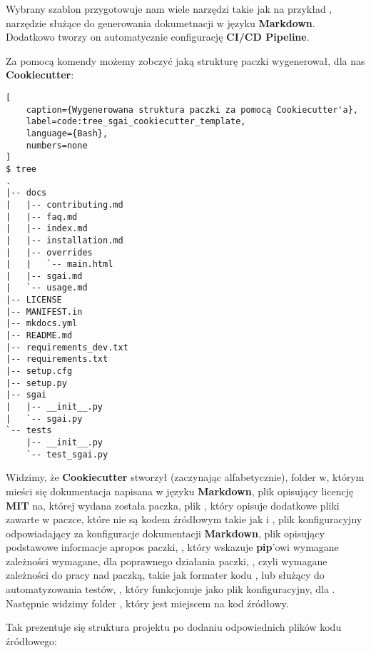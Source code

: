 Wybrany szablon przygotowuje nam wiele narzędzi takie jak na przykład , narzędzie służące do generowania dokumetnacji w języku \textbf{Markdown}.
Dodatkowo tworzy on automatycznie configurację \textbf{CI/CD Pipeline}.

\clearpage

Za pomocą komendy  możemy zobczyć jaką strukturę paczki wygenerował, dla nas \textbf{Cookiecutter}:

\begin{onepage}
    \begin{lstlisting}[
    caption={Wygenerowana struktura paczki za pomocą Cookiecutter'a},
    label=code:tree_sgai_cookiecutter_template,
    language={Bash},
    numbers=none
]
$ tree
.
|-- docs
|   |-- contributing.md
|   |-- faq.md
|   |-- index.md
|   |-- installation.md
|   |-- overrides
|   |   `-- main.html
|   |-- sgai.md
|   `-- usage.md
|-- LICENSE
|-- MANIFEST.in
|-- mkdocs.yml
|-- README.md
|-- requirements_dev.txt
|-- requirements.txt
|-- setup.cfg
|-- setup.py
|-- sgai
|   |-- __init__.py
|   `-- sgai.py
`-- tests
    |-- __init__.py
    `-- test_sgai.py
    \end{lstlisting}
\end{onepage}


Widzimy, że \textbf{Cookiecutter} stworzył (zaczynając alfabetycznie), folder  w, którym mieści się dokumentacja napisana w języku \textbf{Markdown}, plik  opisujący licencję \textbf{MIT} na, której wydana została paczka, plik , który opisuje dodatkowe pliki zawarte w paczce, które nie są kodem źródłowym takie jak  i , plik konfiguracyjny  odpowiadający za konfiguracje dokumentacji \textbf{Markdown}, plik  opisujący podstawowe informacje apropos paczki, , który wskazuje \textbf{pip}'owi wymagane zależności wymagane, dla poprawnego działania paczki, , czyli wymagane zależności do pracy nad paczką, takie jak formater kodu , lub  służący do automatyzowania testów, , który funkcjonuje jako plik konfiguracyjny, dla .
Następnie widzimy folder , który jest miejscem na kod źródłowy.


\clearpage

Tak prezentuje się struktura projektu po dodaniu odpowiednich plików kodu źródłowego:

